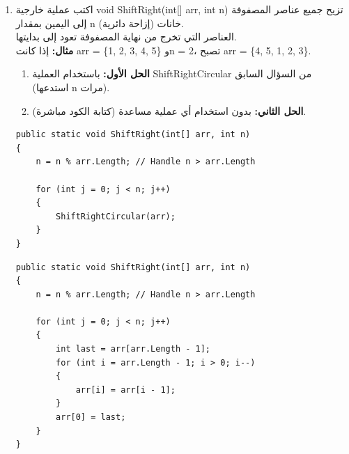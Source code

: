 \documentclass[14pt]{extarticle}
\begin{document}
\begin{enumerate}[resume, itemsep=2em]
    \item
    اكتب عملية خارجية \textenglish{void ShiftRight(int[] arr, int n)} تزيح جميع عناصر المصفوفة إلى اليمين بمقدار \textenglish{n} خانات (إزاحة دائرية).\\
    العناصر التي تخرج من نهاية المصفوفة تعود إلى بدايتها.\\
    \textbf{مثال:} إذا كانت \textenglish{arr = \{1, 2, 3, 4, 5\}} و\textenglish{n = 2}، تصبح \textenglish{arr = \{4, 5, 1, 2, 3\}}.
    \begin{enumerate}[label=\alph*.]
        \item \textbf{الحل الأول:} باستخدام العملية \textenglish{ShiftRightCircular} من السؤال السابق (استدعها \textenglish{n} مرات).
        \item \textbf{الحل الثاني:} بدون استخدام أي عملية مساعدة (كتابة الكود مباشرة).
    \end{enumerate}
    \ifwithsols
    \begin{boxSolution}
    \begin{english}
    \begin{verbatim}
public static void ShiftRight(int[] arr, int n)
{
    n = n % arr.Length; // Handle n > arr.Length

    for (int j = 0; j < n; j++)
    {
        ShiftRightCircular(arr);
    }
}
    \end{verbatim}
    \end{english}
    \end{boxSolution}

    \begin{boxSolution}
    \begin{english}
    \begin{verbatim}
public static void ShiftRight(int[] arr, int n)
{
    n = n % arr.Length; // Handle n > arr.Length

    for (int j = 0; j < n; j++)
    {
        int last = arr[arr.Length - 1];
        for (int i = arr.Length - 1; i > 0; i--)
        {
            arr[i] = arr[i - 1];
        }
        arr[0] = last;
    }
}
    \end{verbatim}
    \end{english}
    \end{boxSolution}
    \fi


\end{enumerate}
\end{document}
